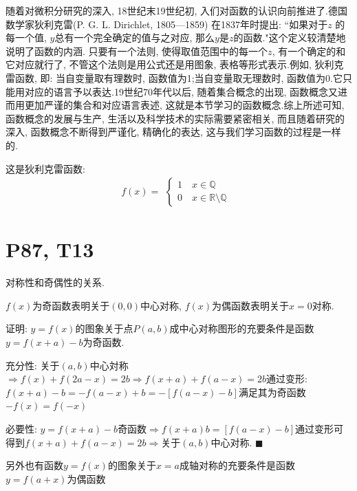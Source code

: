 \documentclass{book}
\begin{document}
    随着对微积分研究的深入, 18世纪末19世纪初, 入们对函数的认识向前推进了.德国数学家狄利克雷(P. G. L. Dirichlet, 1805—1859) 在1837年时提出: ``如果对于$z$ 的每一个值, $y$总有一个完全确定的值与之对应, 那么$y$是$z$的函数."这个定义较清楚地说明了函数的内涵. 只要有一个法则, 使得取值范围中的每一个$z$, 有一个确定的和它对应就行了, 不管这个法则是用公式还是用图象, 表格等形式表示.例如, 狄利克雷函数, 即: 当自变量取有理数时, 函数值为1;当自变量取无理数时, 函数值为0.它只能用对应的语言予以表达.19世纪70年代以后, 随着集合概念的出现, 函数概念又进而用更加严谨的集合和对应语言表述, 这就是本节学习的函数概念.综上所述可知, 函数概念的发展与生产, 生活以及科学技术的实际需要紧密相关, 而且随着研究的深入, 函数概念不断得到严谨化, 精确化的表达, 这与我们学习函数的过程是一样的.

    这是\textcolor[rgb]{0.38,0.11,0.2}{狄利克雷函数}:
    $$
    f(x)=\begin{array}{l} 
            \left\{\begin{matrix} 
            1 \quad x \in \mathbb{Q} \\ 
            0 \quad x \in \mathbb{R} \setminus \mathbb{Q} \
          \end{matrix}\right.    
        \end{array} 
    $$

    \section{\textcolor[rgb]{0.11,0.65,0.52}{P87, T13}}
    \textcolor[rgb]{0.38,0.11,0.2}{对称性}和\textcolor[rgb]{0.38,0.11,0.2}{奇偶性}的关系.

    $f(x)$为奇函数表明关于$(0,0)$中心对称, $f(x)$为偶函数表明关于$x=0$对称.

    \begin{boxB}
        证明: $y=f(x)$的图象关于点$P(a,b)$成中心对称图形的充要条件是函数$y=f(x+a)-b$为奇函数.
    \end{boxB}

    \textcolor[rgb]{0.75,0.17,0.22}{充分性}:
        关于$(a,b)$中心対称$\Longrightarrow f(x)+f(2a-x)=2b\Longrightarrow f(x+a)+f(a-x)=2b$通过变形:$f(x+a)-b=-f(a-x)+b=-[f(a-x)-b]$满足其为奇函数$-f(x)=f(-x)$

    \textcolor[rgb]{0.75,0.17,0.22}{必要性}:
    $y=f(x+a)-b$奇函数$\Longrightarrow f(x+a)b=[f(a-x)-b]$通过变形可得到$f(x+a)+f(a-x)=2b$$\Longrightarrow$关于$(a,b)$中心对称. $\blacksquare$

    另外也有函数$y=f(x)$的图象关于$x=a$成轴对称的充要条件是函数$y=f(a+x)$为偶函数
\end{document}
